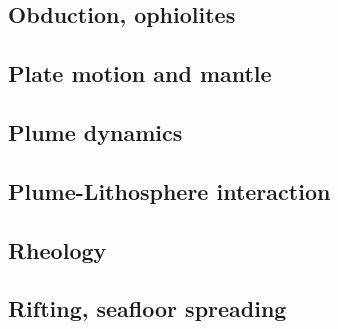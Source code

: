 \cite{yusb82}
\cite{zhyh92}
\cite{zhyu95}
\cite{java11}

\subsection*{Obduction, ophiolites}

\cite{hack90}
\cite{hack91}
\cite{agzf14}

\subsection*{Plate motion and mantle}

\cite{zieg92a}
\cite{zhgm98}
\cite{huss12}
\cite{yoha15}

\subsection*{Plume dynamics}

\cite{nasf94}\cite{hayu94}
\cite{isst06}

\subsection*{Plume-Lithosphere interaction}


\subsection*{Rheology}

\cite{hafn51}
\cite{hand69}
\cite{hirt02}
\cite{hiko03}
\cite{hirw07}



\subsection*{Rifting, seafloor spreading}

\cite{hoen86b}
\cite{zieg92b}
\cite{hupc01}
\cite{hube02}\cite{hani02}
\cite{hube03}\cite{hani03}
\cite{hier04}
\cite{hubb05}
\cite{huha07}
\cite{agcz09}
\cite{aubh10}
\cite{alht11}
\cite{alht12}\cite{alhf12}
\cite{hebr14}
\cite{nabu15}
\cite{olbm16}\cite{jekm16}


